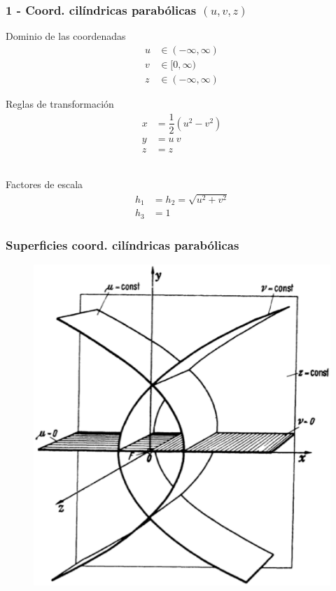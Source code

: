 \documentclass[12pt]{beamer}
\begin{document}
\begin{frame}
\frametitle{1 - Coord. cilíndricas parabólicas $(u, v, z)$}
\fontsize{12}{12}\selectfont
\begin{minipage}{0.45\textwidth}
Dominio de las coordenadas
\begin{align*}
u &\in (-\infty,\infty) \\
v &\in [0,\infty) \\
z &\in(-\infty,\infty)
\end{align*}
\end{minipage}
\hspace{1cm}
\begin{minipage}{0.4\textwidth}
Reglas de transformación
\begin{align*}
x &= \dfrac{1}{2}(u^{2 } -v^{2}) \\
y &= u \: v \\
z &=z
\end{align*}
\end{minipage}
\\
\bigskip
Factores de escala
\begin{align*}
h_{1 } &= h_{2} = \sqrt{u^{2 } +v^{2}} \\
h_{3 } &= 1
\end{align*}
\end{frame}
\begin{frame}
\frametitle{Superficies coord. cilíndricas parabólicas}
\begin{figure}[H]
  \centering
  \includegraphics[scale=0.3]{Imagenes/Sistema_Cilindrico_Parabolico.eps}
\end{figure}
\end{frame}
\end{document}
